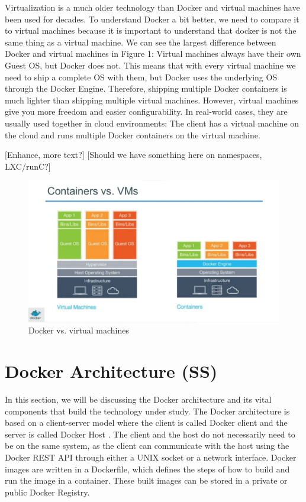 \documentclass[fleqn,12pt]{olplainarticle}
\begin{document}
Virtualization is a much older technology than Docker and virtual machines have been used for decades. To understand Docker a bit better, we need to compare
it to virtual machines because it is important to understand that docker is not the same thing as a virtual machine. We can see the largest difference between Docker and virtual machines in Figure 1: Virtual machines always have their own Guest OS, but Docker does not. This means that with every virtual machine we need to ship a complete OS with them, but Docker uses the underlying OS through the Docker Engine. Therefore, shipping multiple Docker containers is much lighter than shipping multiple virtual machines. However, virtual machines give you more freedom and easier configurability. In real-world cases, they are usually used together in cloud environments: The client has a virtual machine on the cloud and runs multiple Docker containers on the virtual machine.

[Enhance, more text?]
[Should we have something here on namespaces, LXC/runC?]

\begin{figure}[h]
    \centering
    \includegraphics[width=1\textwidth]{docker_vs_vm.png}
    \caption{Docker vs. virtual machines \cite{docker:vs_vm}}
    \label{fig:dockervsvm}
\end{figure}

\section{Docker Architecture (SS)}

In this section, we will be discussing the Docker architecture and its vital components that build the technology under study. The Docker architecture is based on a client-server model where the client is called Docker client and the server is called Docker Host \citep{docker:overview, aquasec:docker_architecture}. The client and the host do not necessarily need to be on the same system, as the client can communicate with the host using the Docker REST API through either a UNIX socket or a network interface. Docker images are written in a Dockerfile, which defines the steps of how to build and run the image in a container. These built images can be stored in a private or public Docker Registry.
\end{document}
